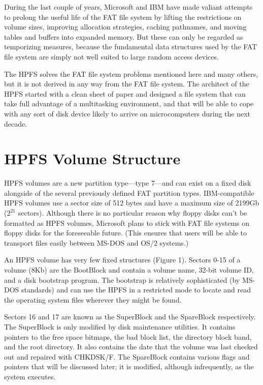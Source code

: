 During the last couple of years, Microsoft and IBM have made valiant attempts
to prolong the useful life of the FAT file system by lifting the restrictions
on volume sizes, improving allocation strategies, caching pathnames, and
moving tables and buffers into expanded memory.  But these can only be
regarded as temporizing measures, because the fundamental data structures
used by the FAT file system are simply not well suited to large random access
devices.
 
The HPFS solves the FAT file system problems mentioned here and many others,
but it is not derived in any way from the FAT file system.  The architect of
the HPFS started with a clean sheet of paper and designed a file system that
can take full advantage of a multitasking environment, and that will be able
to cope with any sort of disk device likely to arrive on microcomputers
during the next decade.
 
\section{\heads HPFS Volume Structure}
 
HPFS volumes are a new partition type---type 7---and can exist on a fixed disk
alongside of the several previously defined FAT partition types.
IBM-compatible HPFS volumes use a sector size of 512 bytes and have a maximum
size of 2199Gb ($2^{21}$ sectors).  Although there is no particular reason why
floppy disks can't be formatted as HPFS volumes, Microsoft plans to stick
with FAT file systems on floppy disks for the foreseeable future.  (This
ensures that users will be able to transport files easily between MS-DOS and
OS/2 systems.)
 
An HPFS volume has very few fixed structures (Figure 1).  Sectors 0-15 of a
volume (8Kb) are the BootBlock and contain a volume name, 32-bit volume ID,
and a disk bootstrap program.  The bootstrap is relatively sophisticated (by
MS-DOS standards) and can use the HPFS in a restricted mode to locate and
read the operating system files wherever they might be found.
 
Sectors 16 and 17 are known as the SuperBlock and the SpareBlock
respectively.  The SuperBlock is only modified by disk maintenance utilities.
It contains pointers to the free space bitmaps, the bad block list, the
directory block band, and the root directory.  It also contains the date that
the volume was last checked out and repaired with CHKDSK/F.  The SpareBlock
contains various flags and pointers that will be discussed later; it is
modified, although infrequently, as the system executes.
 
